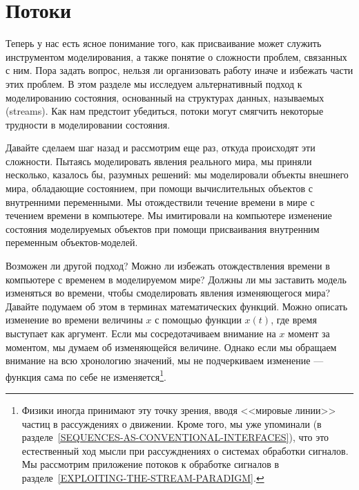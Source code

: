 \section{Потоки}
\label{STREAMS}

Теперь у нас есть ясное понимание того, как присваивание
может служить инструментом моделирования, а также понятие о сложности
проблем, связанных с ним.  Пора задать вопрос, нельзя ли
организовать работу иначе и избежать части этих проблем.  В этом
разделе мы исследуем альтернативный подход к моделированию состояния,
основанный на структурах данных, называемых
 (streams).
Как нам предстоит убедиться, потоки могут
смягчить некоторые трудности в моделировании состояния.

Давайте сделаем шаг назад и рассмотрим еще раз, откуда
происходят эти сложности.  Пытаясь моделировать явления реального
мира, мы приняли несколько, казалось бы, разумных решений: мы
моделировали объекты внешнего мира, обладающие состоянием, при помощи
вычислительных объектов с внутренними переменными.  Мы
отождествили течение времени в мире с течением времени в
компьютере.  Мы имитировали на компьютере изменение состояния моделируемых объектов
при помощи присваивания внутренним переменным объектов-моделей.

Возможен ли другой подход?  Можно ли избежать отождествления
времени в компьютере с временем в моделируемом мире?  Должны ли мы
заставить модель изменяться во времени, чтобы смоделировать явления
изменяющегося мира?  Давайте подумаем об этом в терминах
математических функций.  Можно описать изменение во времени величины
$x$ с помощью функции $x(t)$, где время
выступает как аргумент.  Если мы сосредотачиваем внимание на
$x$ момент за моментом, мы думаем об изменяющейся
величине.  Однако если мы обращаем внимание на всю хронологию
значений, мы не подчеркиваем изменение --- функция сама по себе не
изменяется\footnote{Физики иногда принимают эту точку зрения, вводя
<<мировые
линии>> частиц в рассуждениях о движении.  Кроме того, мы уже
упоминали (в
разделе~\ref{SEQUENCES-AS-CONVENTIONAL-INTERFACES}), что это
естественный ход мысли при рассужднениях о системах обработки сигналов.  Мы
рассмотрим приложение потоков к обработке сигналов в
разделе~\ref{EXPLOITING-THE-STREAM-PARADIGM}.
}.

